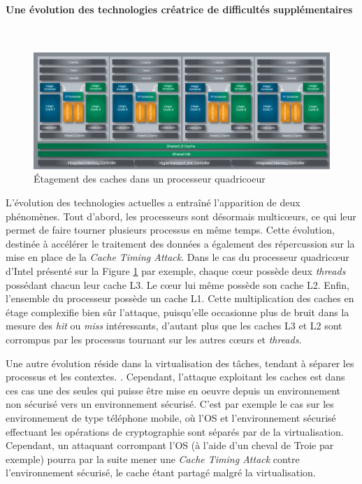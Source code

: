 \documentclass[a4paper,11pt]{article}
\begin{document}
\paragraph{Une évolution des technologies créatrice de difficultés supplémentaires}~\\
\begin{figure}[h]
  \centering
  \includegraphics[width=14cm]{figures/BDArch.png}
  \caption{Étagement des caches dans un processeur quadricoeur}
  \label{etagement} 
\end{figure}
L'évolution des technologies actuelles a entraîné l'apparition de deux phénomènes. Tout d'abord, les processeurs sont désormais multicœurs, ce qui leur permet de faire tourner plusieurs processus en même temps. Cette évolution, destinée à accélérer le traitement des données a également des répercussion sur la mise en place de la \emph{Cache Timing Attack}\cite{weiss2012cache}. Dans le cas du processeur quadricœur d'Intel  présenté sur la Figure \ref{etagement} par exemple, chaque cœur possède deux \emph{threads} possédant chacun leur cache L3. Le cœur lui même possède son cache L2. Enfin, l'ensemble du processeur possède un cache L1. Cette multiplication des caches en étage complexifie bien sûr l'attaque, puisqu'elle occasionne plus de bruit dans la mesure des \emph{hit} ou \emph{miss} intéressants, d'autant plus que les caches L3 et L2 sont corrompus par les processus tournant sur les autres cœurs et \emph{threads}.

Une autre évolution réside dans la virtualisation des tâches, tendant à séparer les processus et les contextes. \cite{weiss2012cache}. Cependant, l'attaque exploitant les caches est dans ces cas une des seules qui puisse être mise en oeuvre depuis un environnement non sécurisé vers un environnement sécurisé. C'est par exemple le cas sur les environnement de type téléphone mobile, où l'OS et l'environnement sécurisé effectuant les opérations de cryptographie sont séparés par de la virtualisation. Cependant, un attaquant corrompant l'OS (à l'aide d'un cheval de Troie par exemple) pourra par la suite mener une \emph{Cache Timing Attack} contre l'environnement sécurisé, le cache étant partagé malgré la virtualisation.
\end{document}
